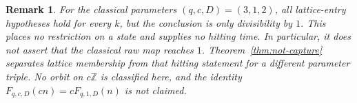 \documentclass[11pt,letterpaper]{article}
\newcommand{\Z}{\mathbb{Z}}
\newtheorem{remark}[theorem]{Remark}
\begin{document}
\begin{remark}
\label{rem:classical}
For the classical parameters \((q,c,D)=(3,1,2)\), all lattice-entry
hypotheses hold for every \(k\), but the conclusion is only divisibility
by \(1\). This places no restriction on a state and supplies no hitting time. In particular, it does not assert that the classical raw map reaches \(1\). Theorem~\ref{thm:not-capture} separates lattice membership from that hitting statement for a different parameter triple. No orbit on \(c\Z\) is classified here, and the identity \(F_{q,c,D}(cn)=cF_{q,1,D}(n)\) is not claimed.
\end{remark}
\end{document}
